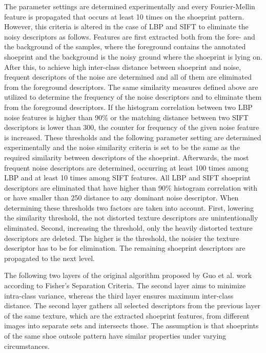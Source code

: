 \documentclass[draft,final]{vutinfth} %
\begin{document}
The parameter settings are determined experimentally and every Fourier-Mellin feature is propagated that occurs at least 10 times on the shoeprint pattern.
However, this criteria is altered in the case of LBP and SIFT to eliminate the noisy descriptors as follows.
Features are first extracted both from the fore- and the background of the samples, where the foreground contains the annotated shoeprint and the background is the noisy ground where the shoeprint is lying on. 
After this, to achieve high inter-class distance between shoeprint and noise, frequent descriptors of the noise are determined and all of them are eliminated from the foreground descriptors.
The same similarity measures defined above are utilized to determine the frequency of the noise descriptors and to eliminate them from the foreground descriptors.
If the histogram correlation between two LBP noise features is higher than 90\% or the matching distance between two SIFT descriptors is lower than 300, the counter for frequency of the given noise feature is increased.
These thresholds and the following parameter setting are determined experimentally and the noise similarity criteria is set to be the same as the required similarity between descriptors of the shoeprint.
Afterwards, the most frequent noise descriptors are determined, occurring at least 100 times among LBP and at least 10 times among SIFT features.
All LBP and SIFT shoeprint descriptors are eliminated that have higher than 90\% histogram correlation with or have smaller than 250 distance to any dominant noise descriptor.
When determining these thresholds two factors are taken into account.
First, lowering the similarity threshold, the not distorted texture descriptors are unintentionally eliminated. 
Second, increasing the threshold, only the heavily distorted texture descriptors are deleted.
The higher is the threshold, the noisier the texture descriptor has to be for elimination. 
The remaining shoeprint descriptors are propagated to the next level. 
\par
The following two layers of the original algorithm proposed by Guo et al. \cite{guo2012discriminative}  work according to Fisher's Separation Criteria.
The second layer aims to minimize intra-class variance, whereas the third layer ensures maximum inter-class distance. 
The second layer gathers all selected descriptors from the previous layer of the same texture, which are the extracted shoeprint features, from different images into separate sets and intersects those. 
The assumption is that shoeprints of the same shoe outsole pattern have similar properties under varying circumstances.
\end{document}
